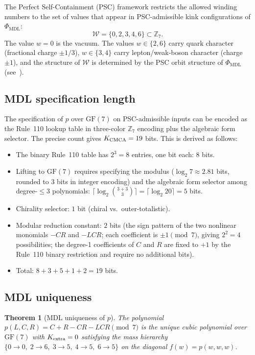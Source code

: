 \documentclass[11pt]{article}
\newtheorem{theorem}{Theorem}[section]
\theoremstyle{remark}
\newcommand{\PHIMDL}{\Phi_{\mathrm{MDL}}}
\newcommand{\ZS}{\mathbb{Z}_7}
\newcommand{\GFseven}{\mathrm{GF}(7)}
\begin{document}
The Perfect Self-Containment (PSC) framework restricts the allowed winding numbers to
the set of values that appear in PSC-admissible kink configurations of $\PHIMDL$:
\[
  \mathcal{W} = \{0, 2, 3, 4, 6\} \subset \ZS.
\]
The value $w=0$ is the vacuum. The values $w \in \{2,6\}$ carry quark character
(fractional charge $\pm 1/3$), $w\in\{3,4\}$ carry lepton/weak-boson character
(charge $\pm 1$), and the structure of $\mathcal{W}$ is determined by the
PSC orbit structure of $\PHIMDL$ (see~\cite{SpivackPhiMDLField,SpivackThreeTapeCMCA}).

\subsection{MDL specification length}
\label{ssec:mdl_spec}

The specification of $p$ over $\GFseven$ on PSC-admissible inputs can be encoded
as the Rule~110 lookup table in three-color $\ZS$ encoding plus the algebraic
form selector. The precise count gives $K_{\rm CMCA} = 19$ bits. This is derived
as follows:
\begin{itemize}[itemsep=2pt]
  \item The binary Rule~110 table has $2^3 = 8$ entries, one bit each: $8$ bits.
  \item Lifting to $\GFseven$ requires specifying the modulus ($\log_2 7 \approx 2.81$
        bits, rounded to $3$ bits in integer encoding) and the algebraic form
        selector among degree-$\le 3$ polynomials: $\lceil\log_2 \binom{3+3}{3}\rceil
        = \lceil\log_2 20\rceil = 5$ bits.
  \item Chirality selector: $1$ bit (chiral vs.\ outer-totalistic).
  \item Modular reduction constant: $2$ bits (the sign pattern of the two nonlinear
        monomials $-CR$ and $-LCR$; each coefficient is $\pm 1\pmod{7}$, giving
        $2^2 = 4$ possibilities; the degree-1 coefficients of $C$ and $R$ are fixed to
        $+1$ by the Rule~110 binary restriction and require no additional bits).
  \item Total: $8 + 3 + 5 + 1 + 2 = 19$ bits.
\end{itemize}

\subsection{MDL uniqueness}
\label{ssec:mdl_unique}

\begin{theorem}[MDL uniqueness of $p$]
\label{thm:unique}
The polynomial $p(L,C,R) = C+R-CR-LCR \pmod{7}$ is the unique cubic polynomial
over $\GFseven$ with $K_{\rm extra} = 0$ satisfying the mass hierarchy
$\{0\to0,\;2\to6,\;3\to5,\;4\to5,\;6\to5\}$ on the diagonal $f(w) = p(w,w,w)$.
\end{theorem}
\end{document}
